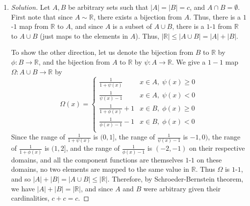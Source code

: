 \documentclass{article}
\newcommand{\N}{{\mathbb N}}
\newcommand{\R}{{\mathbb R}}
\begin{document}
\begin{enumerate}
\begin{proof}[Solution]
	To show the other direction, let us denote the bijection from $B$ to $\R$
	by $\phi \colon B \to \R$,
	and the bijection from $A$ to $\N$ by $\psi \colon A \to \N$.
	We give a $1-1$ map $\Omega \colon A \cup B \to \R$ by
	\[
		\Omega(x) = \begin{cases}
			\psi(x) & x \in A\\
			\frac{1}{1+\phi(x)} & x \in B, \; \phi(x) > 0\\
			\frac{1}{\phi(x)-1} & x \in B, \; \phi(x) < 0\\
			0.1 & x \in B, \; \phi(x) = 0
		\end{cases}
	\]
	Since the range of $\psi(x)$ is $\N$, the range of $\frac{1}{1+\phi(x)}$ is $(0,1)$,
	the range of $\frac{1}{\phi(x)-1}$ is $(-1,0)$, and the range of the last function is $\{0,1\}$,
	on their respective domains,
	and all the component functions are themselves $1$-$1$ on these domains,
	no two elements are mapped to the same value in $\R$.
	Thus $\Omega$ is $1$-$1$,
	and so $|A| + |B| = |A \cup B| \leq |\R|$.
	Therefore, by Schroeder-Bernstein theorem, we have $|A| + |B| = |\R|$,
	and since $A$ and $B$ were arbitrary given their cardinalities,
	$\aleph_0 + c = c$.
\end{proof}
\item \begin{proof}[Solution]\let\qed\relax
	Let $A,B$ be arbitrary sets such that $|A|=|B|=c$,
	and $A\cap B = \emptyset$.
	First note that since $A \sim \R$,
	there exists a bijection from $A$.
	Thus, there is a $1$-$1$ map from $\R$ to $A$,
	and since $A$ is a subset of $A \cup B$,
	there is a $1$-$1$ from $\R$ to $A \cup B$ (just maps to the elements in $A$).
	Thus, $|\R| \leq |A\cup B| = |A| + |B|$.

	To show the other direction, let us denote the bijection from $B$ to $\R$
	by $\phi \colon B \to \R$,
	and the bijection from $A$ to $\R$ by $\psi \colon A \to \R$.
	We give a $1-1$ map $\Omega \colon A \cup B \to \R$ by
	\[
		\Omega(x) = \begin{cases}
			\frac{1}{1+\psi(x)} & x \in A, \; \psi(x) \geq 0\\
			\frac{1}{\psi(x)-1} & x \in A, \; \psi(x) < 0\\
			\frac{1}{1+\phi(x)} + 1& x \in B, \; \phi(x) \geq 0\\
			\frac{1}{\phi(x)-1} - 1& x \in B, \; \phi(x) < 0\\
		\end{cases}
	\]
	Since the range of $\frac{1}{1+\psi(x)}$ is $(0,1]$,
	the range of $\frac{1}{\psi(x)-1}$ is $-1,0)$,
	the range of $\frac{1}{1+\phi(x)}$ is $(1,2]$,
	and the range of $\frac{1}{\phi(x) - 1}$ is $(-2,-1)$
	on their respective domains,
	and all the component functions are themselves $1$-$1$ on these domains,
	no two elements are mapped to the same value in $\R$.
	Thus $\Omega$ is $1$-$1$,
	and so $|A| + |B| = |A \cup B| \leq |\R|$.
	Therefore, by Schroeder-Bernstein theorem, we have $|A| + |B| = |\R|$,
	and since $A$ and $B$ were arbitrary given their cardinalities,
	$c + c = c$.
\end{proof}

\end{enumerate}
\clearpage
\end{document}
